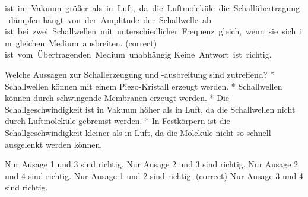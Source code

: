 \documentclass[11pt]{exam}
\begin{document}
\begin{questions}
\begin{choices}
	\choice ist im Vakuum größer als in Luft, da die Luftmoleküle die Schallübertragung dämpfen
	\choice hängt von der Amplitude der Schallwelle ab
	\choice ist bei zwei Schallwellen mit unterschiedlicher Frequenz gleich, wenn sie sich im gleichen Medium ausbreiten. (correct)
	\choice ist vom Übertragenden Medium unabhängig
	\choice Keine Antwort ist richtig.
\end{choices}

\vspace{3mm}\question Welche Aussagen zur Schallerzeugung und -ausbreitung sind zutreffend?	* Schallwellen können mit einem Piezo-Kristall erzeugt werden.	* Schallwellen können durch schwingende Membranen erzeugt werden.	* Die Schallgeschwindigkeit ist in Vakuum höher als in Luft, da die Schallwellen nicht durch Luftmoleküle gebremst werden.	* In Festkörpern ist die Schallgeschwindigkeit kleiner als in Luft, da die Moleküle nicht so schnell ausgelenkt werden können. 

\begin{choices}
	\choice Nur Ausage 1 und 3 sind richtig.
	\choice Nur Ausage 2 und 3 sind richtig.
	\choice Nur Ausage 2 und 4 sind richtig.
	\choice Nur Ausage 1 und 2 sind richtig. (correct)
	\choice Nur Ausage 3 und 4 sind richtig.
\end{choices}

\vspace{3mm}\end{questions}
\end{document}

